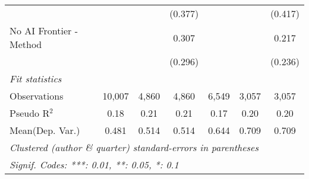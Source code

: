 \begin{tabular}{lcccccc}
                           &               &               & (0.377)      &               &               & (0.417)\\   
   No AI Frontier - Method &               &               & 0.307        &               &               & 0.217\\   
                           &               &               & (0.296)      &               &               & (0.236)\\   
   \midrule
   \emph{Fit statistics}\\
   Observations            & 10,007        & 4,860         & 4,860        & 6,549         & 3,057         & 3,057\\  
   Pseudo R$^2$            & 0.18          & 0.21          & 0.21         & 0.17          & 0.20          & 0.20\\  
Mean(Dep. Var.) & 0.481 & 0.514 & 0.514 & 0.644 & 0.709 & 0.709 \\
   \midrule \midrule
   \multicolumn{7}{l}{\emph{Clustered (author \& quarter) standard-errors in parentheses}}\\
   \multicolumn{7}{l}{\emph{Signif. Codes: ***: 0.01, **: 0.05, *: 0.1}}\\
\end{tabular}
\par\endgroup
